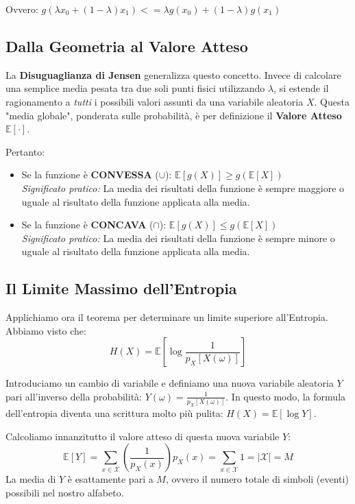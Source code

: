 Ovvero: $g(\lambda x_0 + (1-\lambda)x_1) <= \lambda g(x_0) + (1-\lambda)g(x_1)$
\subsection{Dalla Geometria al Valore Atteso}

La \textbf{Disuguaglianza di Jensen} generalizza questo concetto. Invece di calcolare una semplice media pesata tra due soli punti fisici utilizzando $\lambda$, si estende il ragionamento a \textit{tutti} i possibili valori assunti da una variabile aleatoria $X$. Questa "media globale", ponderata sulle probabilità, è per definizione il \textbf{Valore Atteso $\mathbb{E}[\cdot]$}.

Pertanto:
\begin{itemize}
    \item Se la funzione è \textbf{CONVESSA} ($\cup$): $\mathbb{E}[g(X)] \ge g(\mathbb{E}[X])$ \\
    \textit{Significato pratico:} La media dei risultati della funzione è sempre maggiore o uguale al risultato della funzione applicata alla media.
    \item Se la funzione è \textbf{CONCAVA} ($\cap$): $\mathbb{E}[g(X)] \le g(\mathbb{E}[X])$ \\
    \textit{Significato pratico:} La media dei risultati della funzione è sempre minore o uguale al risultato della funzione applicata alla media.
\end{itemize}

\subsection{Il Limite Massimo dell'Entropia}

Applichiamo ora il teorema per determinare un limite superiore all'Entropia. Abbiamo visto che:
\begin{equation}
H(X) = \mathbb{E}\left[\log \frac{1}{p_X[X(\omega)]}\right]
\end{equation}

Introduciamo un cambio di variabile e definiamo una nuova variabile aleatoria $Y$ pari all'inverso della probabilità: $Y(\omega) = \frac{1}{p_X[X(\omega)]}$. 
In questo modo, la formula dell'entropia diventa una scrittura molto più pulita: $H(X) = \mathbb{E}[\log Y]$.

Calcoliamo innanzitutto il valore atteso di questa nuova variabile $Y$:
\begin{equation}
\mathbb{E}[Y] = \sum_{x \in \mathcal{X}} \left( \frac{1}{p_X(x)} \right) p_X(x) = \sum_{x \in \mathcal{X}} 1 = |\mathcal{X}| = M
\end{equation}
La media di $Y$ è esattamente pari a $M$, ovvero il numero totale di simboli (eventi) possibili nel nostro alfabeto.

